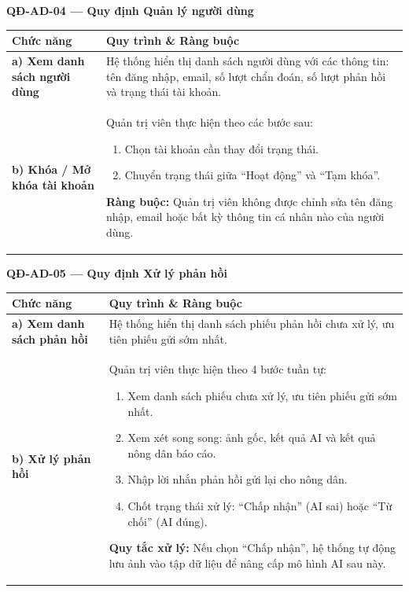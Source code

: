 \documentclass[12pt,a4paper]{article}
\begin{document}
\vspace{0.3cm}
\noindent\textbf{QĐ-AD-04 --- Quy định Quản lý người dùng}
 
\begin{longtable}{|
    >{\raggedright\arraybackslash}p{2.8cm}|
    >{\raggedright\arraybackslash}p{12cm}|}
\hline
\rowcolor{headerblue}
\textbf{Chức năng} & \textbf{Quy trình \& Ràng buộc} \\
\hline
\endhead
\textbf{a) Xem danh sách người dùng} &
Hệ thống hiển thị danh sách người dùng với các thông tin: tên đăng nhập, email, số lượt chẩn đoán, số lượt phản hồi và trạng thái tài khoản. \\
\hline
\textbf{b) Khóa / Mở khóa tài khoản} &
Quản trị viên thực hiện theo các bước sau:
\begin{enumerate}[leftmargin=*,topsep=2pt,itemsep=1pt]
    \item Chọn tài khoản cần thay đổi trạng thái.
    \item Chuyển trạng thái giữa ``Hoạt động'' và ``Tạm khóa''.
\end{enumerate}
\textbf{Ràng buộc:} Quản trị viên không được chỉnh sửa tên đăng nhập, email hoặc bất kỳ thông tin cá nhân nào của người dùng. \\
\hline
\end{longtable}
 
\vspace{0.3cm}
\noindent\textbf{QĐ-AD-05 --- Quy định Xử lý phản hồi}
 
\begin{longtable}{|
    >{\raggedright\arraybackslash}p{2.8cm}|
    >{\raggedright\arraybackslash}p{12cm}|}
\hline
\rowcolor{headerblue}
\textbf{Chức năng} & \textbf{Quy trình \& Ràng buộc} \\
\hline
\endhead
\textbf{a) Xem danh sách phản hồi} &
Hệ thống hiển thị danh sách phiếu phản hồi chưa xử lý, ưu tiên phiếu gửi sớm nhất. \\
\hline
\textbf{b) Xử lý phản hồi} &
Quản trị viên thực hiện theo 4 bước tuần tự:
\begin{enumerate}[leftmargin=*,topsep=2pt,itemsep=1pt]
    \item Xem danh sách phiếu chưa xử lý, ưu tiên phiếu gửi sớm nhất.
    \item Xem xét song song: ảnh gốc, kết quả AI và kết quả nông dân báo cáo.
    \item Nhập lời nhắn phản hồi gửi lại cho nông dân.
    \item Chốt trạng thái xử lý: ``Chấp nhận'' (AI sai) hoặc ``Từ chối'' (AI đúng).
\end{enumerate}
\textbf{Quy tắc xử lý:} Nếu chọn ``Chấp nhận'', hệ thống tự động lưu ảnh vào tập dữ liệu để nâng cấp mô hình AI sau này. \\
\hline
\end{longtable}
 
\end{document}
